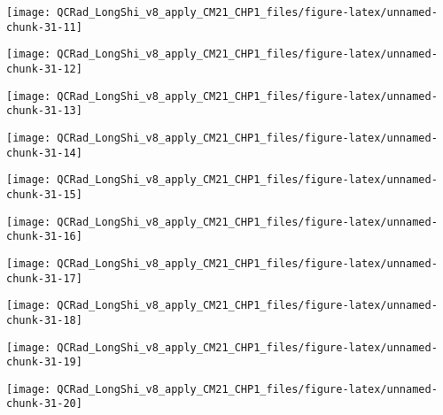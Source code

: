 \documentclass[
  10pt,
  a4paper,oneside]{article}
\begin{document}
\begin{center}\texttt{[image: QCRad\_LongShi\_v8\_apply\_CM21\_CHP1\_files/figure-latex/unnamed-chunk-31-11]} \end{center}

\begin{center}\texttt{[image: QCRad\_LongShi\_v8\_apply\_CM21\_CHP1\_files/figure-latex/unnamed-chunk-31-12]} \end{center}

\begin{center}\texttt{[image: QCRad\_LongShi\_v8\_apply\_CM21\_CHP1\_files/figure-latex/unnamed-chunk-31-13]} \end{center}

\begin{center}\texttt{[image: QCRad\_LongShi\_v8\_apply\_CM21\_CHP1\_files/figure-latex/unnamed-chunk-31-14]} \end{center}

\begin{center}\texttt{[image: QCRad\_LongShi\_v8\_apply\_CM21\_CHP1\_files/figure-latex/unnamed-chunk-31-15]} \end{center}

\begin{center}\texttt{[image: QCRad\_LongShi\_v8\_apply\_CM21\_CHP1\_files/figure-latex/unnamed-chunk-31-16]} \end{center}

\begin{center}\texttt{[image: QCRad\_LongShi\_v8\_apply\_CM21\_CHP1\_files/figure-latex/unnamed-chunk-31-17]} \end{center}

\begin{center}\texttt{[image: QCRad\_LongShi\_v8\_apply\_CM21\_CHP1\_files/figure-latex/unnamed-chunk-31-18]} \end{center}

\begin{center}\texttt{[image: QCRad\_LongShi\_v8\_apply\_CM21\_CHP1\_files/figure-latex/unnamed-chunk-31-19]} \end{center}

\begin{center}\texttt{[image: QCRad\_LongShi\_v8\_apply\_CM21\_CHP1\_files/figure-latex/unnamed-chunk-31-20]} \end{center}
\end{document}
